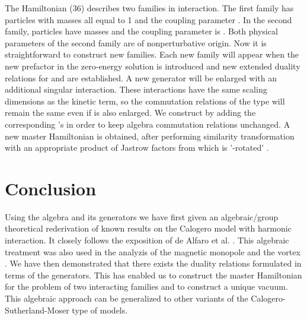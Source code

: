 \documentclass[a4paper,preprint,aps]{revtex4}
\begin{document}
 The Hamiltonian (36) describes two families in interaction. The first family
 has particles with masses all equal to 1 and the coupling parameter \myHighlight{$\lambda$}\coordHE{}.
In the second family, particles have masses \myHighlight{$\frac{\kappa}{\lambda}$}\coordHE{} and the
coupling parameter is \coordHE{}. Both physical parameters
 of the second family are of nonperturbative origin. Now it is straightforward
 to construct new families. Each new family will appear when the new prefactor
 in the zero-energy solution is introduced and new extended duality relations 
for \coordHE{} and \coordHE{} are established. A new \coordHE{} generator will be
enlarged with an additional singular interaction. These interactions have the 
same scaling dimensions as the kinetic term, so the commutation relations of
 the type \coordHE{} will remain the same even
if \coordHE{} is also enlarged. We construct \coordHE{} by adding the
 corresponding \coordHE{}'s in order to keep \coordHE{} algebra commutation
 relations unchanged. A new master Hamiltonian is obtained, after performing 
similarity transformation with an appropriate product of Jastrow factors from
 \coordHE{} which is '\coordHE{}-rotated' \coordHE{}.


\section{Conclusion}


Using the \coordHE{} algebra and its generators we have first given an
 algebraic/group theoretical rederivation of known results on the Calogero
 model with harmonic interaction. It closely follows the exposition of
 de Alfaro et al. \cite{AFF}. This algebraic treatment was also used in
 the analyzis of the magnetic monopole and the vortex \cite{Jac}. We have then
 demonstrated that there exists the duality relations formulated in terms of
 the generators. This has enabled us to construct the master Hamiltonian for
 the problem of two interacting families and to construct a unique vacuum.
 This algebraic approach can be generalized to other variants of the
 Calogero-Sutherland-Moser type of models.
\end{document}
